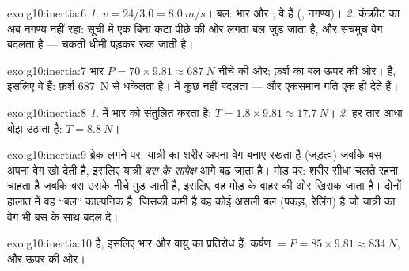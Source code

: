 \begin{solution}{exo:g10:inertia:6}
\emph{1.} $v = 24/3.0 = \qty{8.0}{m/s}$। बल: भार और ;
वे  हैं (, 
नगण्य)। \emph{2.} कंक्रीट का  अब नगण्य नहीं रहा: सूची में
एक बिना कटा पीछे की ओर लगता बल जुड़ जाता है, और सचमुच वेग बदलता
है --- चकती धीमी पड़कर रुक जाती है।
\end{solution}

\begin{solution}{exo:g10:inertia:7}
भार $P = 70 \times 9.81 \approx \qty{687}{N}$ नीचे की ओर; फ़र्श का बल ऊपर की ओर।
 है, इसलिए वे  हैं: फ़र्श
\qty{687}{N} से धकेलता है।  में कुछ नहीं बदलता ---  और एकसमान गति
एक ही  देते हैं।
\end{solution}

\begin{solution}{exo:g10:inertia:8}
\emph{1.}  में  भार को संतुलित करता है:
$T = 1.8 \times 9.81 \approx \qty{17.7}{N}$। \emph{2.} हर  तार आधा बोझ उठाता है: $T = \qty{8.8}{N}$।
\end{solution}

\begin{solution}{exo:g10:inertia:9}
ब्रेक लगने पर: यात्री का शरीर अपना वेग बनाए रखता है (जड़त्व) जबकि बस
अपना वेग खो देती है, इसलिए यात्री \emph{बस के सापेक्ष} आगे बढ़ जाता है।
मोड़ पर: शरीर सीधा चलते रहना चाहता है जबकि बस उसके नीचे मुड़ जाती है,
इसलिए वह मोड़ के बाहर की ओर खिसक जाता है। दोनों हालात में वह
``बल'' काल्पनिक है; जिसकी कमी है वह कोई असली बल (पकड़,
रेलिंग) है जो यात्री का वेग भी बस के साथ बदल दे।
\end{solution}

\begin{solution}{exo:g10:inertia:10}
 है, इसलिए भार और वायु का प्रतिरोध
 हैं: कर्षण $= P = 85 \times 9.81 \approx \qty{834}{N}$,  और ऊपर की ओर।
\end{solution}

